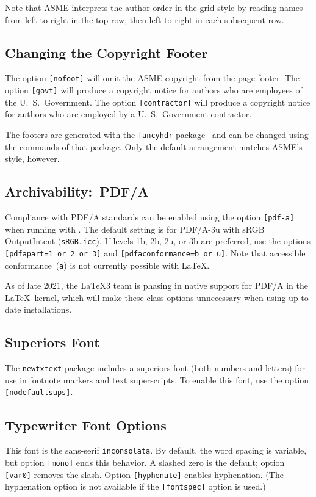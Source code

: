 \documentclass[balance,upint,subscriptcorrection,varvw,mathalfa=cal=boondoxo,spanish,french,vietnamese,russian,greek,pdf-a,fontspec,colorlinks]{asmeconf}
\begin{document}
Note that ASME interprets the author order in the grid style by reading names from left-to-right in the top row, then left-to-right in each subsequent row.

\subsection{Changing the Copyright Footer} The option \texttt{[nofoot]} will omit the ASME copyright from the page footer. The option \texttt{[govt]} will produce a copyright notice for authors who are employees of the U.\ S.\ Government.  The option \texttt{[contractor]} will produce a copyright
notice for authors who are employed by a U.\ S.\ Government contractor.

The footers are generated with the \texttt{fancyhdr} package~\cite{oostrum} and can be changed using the commands of that package. Only the default arrangement matches ASME's style, however.

\subsection{Archivability:~PDF/A} Compliance with PDF/A standards can be enabled using the option \texttt{[pdf-a]} 
when running with . The default setting is for PDF/A-3u with sRGB OutputIntent (\texttt{sRGB.icc}). 
If levels 1b, 2b, 2u, or 3b are preferred, use the options \texttt{[pdfapart=1 or 2 or 3]} and 
\texttt{[pdfaconformance=b or u]}. Note that accessible conformance~(\texttt{a}) is not currently possible with \LaTeX.

As of late 2021, the \LaTeX 3 team is phasing in native support for PDF/A in the \LaTeX\ kernel, which will make these
class options unnecessary when using up-to-date installations.

\subsection{Superiors Font} The \texttt{newtxtext} package includes a superiors font (both numbers and letters) for use in footnote markers and text superscripts. To enable this font, use the option \texttt{[nodefaultsups]}. 

\subsection{Typewriter Font Options} This font is the sans-serif \texttt{inconsolata}. By default, the word spacing is variable, but option \texttt{[mono]} ends this behavior. A slashed zero is the default; option \texttt{[var0]} removes the slash. Option \texttt{[hyphenate]} enables hyphenation. (The hyphenation option is not available if the \texttt{[fontspec]} option is used.)
\end{document}
